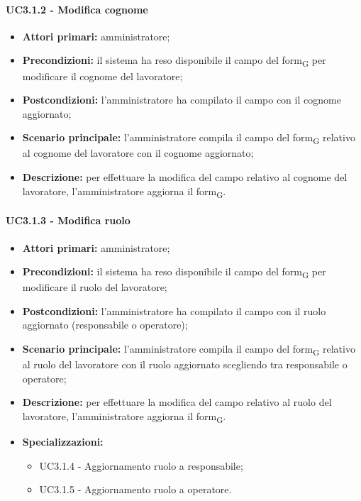 \paragraph{UC3.1.2 - Modifica cognome}

\begin{itemize}
	\item 	\textbf{Attori primari:} amministratore;
	\item 	\textbf{Precondizioni:} il sistema ha reso disponibile il campo del form\textsubscript{G} per modificare il cognome del lavoratore;
	\item 	\textbf{Postcondizioni:} l'amministratore ha compilato il campo con il cognome aggiornato;
	\item 	\textbf{Scenario principale:} l'amministratore compila il campo del form\textsubscript{G} relativo al cognome del lavoratore con il cognome aggiornato;
	\item 	\textbf{Descrizione:} per effettuare la modifica del campo relativo al cognome del lavoratore, l'amministratore aggiorna il form\textsubscript{G}.

\end{itemize}
\paragraph{UC3.1.3 - Modifica ruolo}

\begin{itemize}
	\item 	\textbf{Attori primari:} amministratore;
	\item 	\textbf{Precondizioni:} il sistema ha reso disponibile il campo del form\textsubscript{G} per modificare il ruolo del lavoratore;
	\item 	\textbf{Postcondizioni:} l'amministratore ha compilato il campo con il ruolo aggiornato (responsabile o operatore);
	\item 	\textbf{Scenario principale:} l'amministratore compila il campo del form\textsubscript{G} relativo al ruolo del lavoratore con il ruolo aggiornato scegliendo tra responsabile o operatore;
	\item 	\textbf{Descrizione:} per effettuare la modifica del campo relativo al ruolo del lavoratore, l'amministratore aggiorna il form\textsubscript{G}.
	\item 	\textbf{Specializzazioni:}
	\begin{itemize}
		\item UC3.1.4 - Aggiornamento ruolo a responsabile;
		\item UC3.1.5 - Aggiornamento ruolo a operatore.
	\end{itemize}

\end{itemize}

